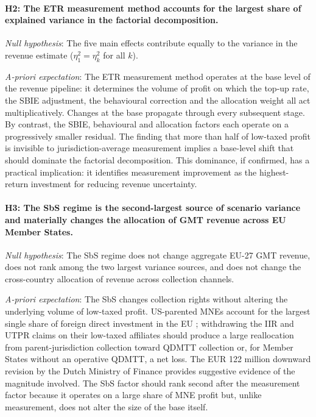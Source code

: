 \documentclass[11pt,a4paper]{article}
\begin{document}
\paragraph{H2: The ETR measurement method accounts for the largest share of explained variance in the factorial decomposition.}

\noindent\textit{Null hypothesis}: The five main effects contribute equally to the variance in the revenue estimate ($\eta_1^2 = \eta_k^2$ for all $k$).

\noindent\textit{A-priori expectation}: The ETR measurement method operates at the base level of the revenue pipeline: it determines the volume of profit on which the top-up rate, the SBIE adjustment, the behavioural correction and the allocation weight all act multiplicatively. Changes at the base propagate through every subsequent stage. By contrast, the SBIE, behavioural and allocation factors each operate on a progressively smaller residual. The \citet{hugger2026} finding that more than half of low-taxed profit is invisible to jurisdiction-average measurement implies a base-level shift that should dominate the factorial decomposition. This dominance, if confirmed, has a practical implication: it identifies measurement improvement as the highest-return investment for reducing revenue uncertainty.

\paragraph{H3: The SbS regime is the second-largest source of scenario variance and materially changes the allocation of GMT revenue across EU Member States.}

\noindent\textit{Null hypothesis}: The SbS regime does not change aggregate EU-27 GMT revenue, does not rank among the two largest variance sources, and does not change the cross-country allocation of revenue across collection channels.

\noindent\textit{A-priori expectation}: The SbS changes collection rights without altering the underlying volume of low-taxed profit. US-parented MNEs account for the largest single share of foreign direct investment in the EU \citep[\textit{cf.}][]{oecd2025}; withdrawing the IIR and UTPR claims on their low-taxed affiliates should produce a large reallocation from parent-jurisdiction collection toward QDMTT collection or, for Member States without an operative QDMTT, a net loss. The EUR 122 million downward revision by the Dutch Ministry of Finance \citep{1028} provides suggestive evidence of the magnitude involved. The SbS factor should rank second after the measurement factor because it operates on a large share of MNE profit but, unlike measurement, does not alter the size of the base itself.
\end{document}
